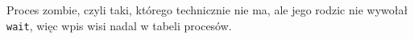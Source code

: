 Proces zombie, czyli taki, którego technicznie nie ma, ale jego rodzic nie wywołał \texttt{wait}, więc wpis wisi nadal w tabeli procesów.
